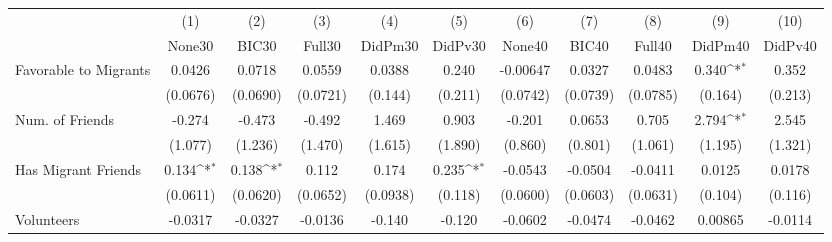 {
\def\sym#1{\ifmmode^{#1}\else\(^{#1}\)\fi}
\begin{tabular}{l*{10}{c}}
\toprule
            &\multicolumn{1}{c}{(1)}&\multicolumn{1}{c}{(2)}&\multicolumn{1}{c}{(3)}&\multicolumn{1}{c}{(4)}&\multicolumn{1}{c}{(5)}&\multicolumn{1}{c}{(6)}&\multicolumn{1}{c}{(7)}&\multicolumn{1}{c}{(8)}&\multicolumn{1}{c}{(9)}&\multicolumn{1}{c}{(10)}\\
            &\multicolumn{1}{c}{None30}&\multicolumn{1}{c}{BIC30}&\multicolumn{1}{c}{Full30}&\multicolumn{1}{c}{DidPm30}&\multicolumn{1}{c}{DidPv30}&\multicolumn{1}{c}{None40}&\multicolumn{1}{c}{BIC40}&\multicolumn{1}{c}{Full40}&\multicolumn{1}{c}{DidPm40}&\multicolumn{1}{c}{DidPv40}\\
\midrule
Favorable to Migrants&      0.0426         &      0.0718         &      0.0559         &      0.0388         &       0.240         &    -0.00647         &      0.0327         &      0.0483         &       0.340\sym{*}  &       0.352         \\
            &    (0.0676)         &    (0.0690)         &    (0.0721)         &     (0.144)         &     (0.211)         &    (0.0742)         &    (0.0739)         &    (0.0785)         &     (0.164)         &     (0.213)         \\
\addlinespace
Num. of Friends&      -0.274         &      -0.473         &      -0.492         &       1.469         &       0.903         &      -0.201         &      0.0653         &       0.705         &       2.794\sym{*}  &       2.545         \\
            &     (1.077)         &     (1.236)         &     (1.470)         &     (1.615)         &     (1.890)         &     (0.860)         &     (0.801)         &     (1.061)         &     (1.195)         &     (1.321)         \\
\addlinespace
Has Migrant Friends&       0.134\sym{*}  &       0.138\sym{*}  &       0.112         &       0.174         &       0.235\sym{*}  &     -0.0543         &     -0.0504         &     -0.0411         &      0.0125         &      0.0178         \\
            &    (0.0611)         &    (0.0620)         &    (0.0652)         &    (0.0938)         &     (0.118)         &    (0.0600)         &    (0.0603)         &    (0.0631)         &     (0.104)         &     (0.116)         \\
\addlinespace
Volunteers  &     -0.0317         &     -0.0327         &     -0.0136         &      -0.140         &      -0.120         &     -0.0602         &     -0.0474         &     -0.0462         &     0.00865         &     -0.0114         \\

\end{tabular}}
